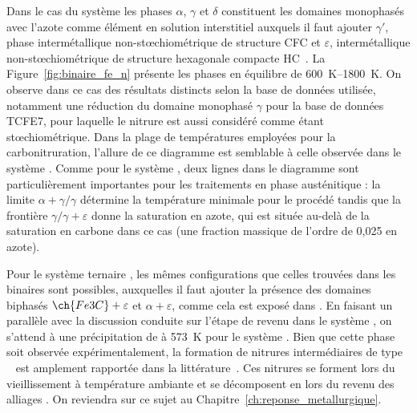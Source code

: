 Dans le cas du système  les phases $\alpha$, $\gamma$ et $\delta$ constituent les domaines monophasés \textendash{} avec l'azote comme élément en solution interstitiel \textendash{} auxquels il faut ajouter $\gamma\prime$, phase intermétallique  non-st{\oe}chiométrique de structure \og{}CFC\fg{} et $\varepsilon$, intermétallique  non-st{\oe}chiométrique de structure hexagonale compacte \og{}HC\fg{}~\cite{Frisk199179,Du1993,Gantois2010}. La Figure~\ref{fig:binaire_fe_n} présente les phases en équilibre de \SIrange{600}{1800}{\kelvin}. On observe dans ce cas des résultats distincts selon la base de données utilisée, notamment une réduction du domaine monophasé $\gamma$ pour la base de données TCFE7, pour laquelle le nitrure  est aussi considéré comme étant st{\oe}chiométrique. Dans la plage de températures employées pour la carbonitruration, l'allure de ce diagramme est semblable à celle observée dans le système . Comme pour le système , deux lignes dans le diagramme sont particulièrement importantes pour les traitements en phase austénitique : la limite $\alpha+\gamma/\gamma$ détermine la température minimale pour le procédé tandis que la frontière $\gamma/\gamma+\varepsilon$ donne la saturation en azote, qui est située au-delà de la saturation en carbone dans ce cas (une fraction massique de l'ordre de 0,025 en azote).

Pour le système ternaire , les mêmes configurations que celles trouvées dans les binaires sont possibles, auxquelles il faut ajouter la présence des domaines biphasés $\ch{Fe3C}+\varepsilon$ et $\alpha+\varepsilon$, comme cela est exposé dans \citet{Gantois2010}. En faisant un parallèle avec la discussion conduite sur l'étape de revenu dans le système , on s'attend à une précipitation de  à \SI{573}{\kelvin} pour le système . Bien que cette phase soit observée expérimentalement, la formation de nitrures intermédiaires de type ~\cite{Liu2000} est amplement rapportée dans la littérature~\cite{Kaplow1983,vanGent1985,Mittemeijer1988,Cheng199013,Cheng19902857,Fall1996,vanGenderen1997,Sherby2008}. Ces nitrures se forment lors du vieillissement à température ambiante et se décomposent en  lors du revenu des alliages . On reviendra sur ce sujet au Chapitre~\ref{ch:reponse_metallurgique}.


